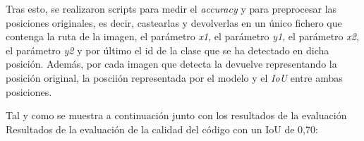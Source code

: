 Tras esto, se realizaron scripts para medir el \textit{accuracy} y para preprocesar las posiciones originales, es decir, castearlas y devolverlas en un único fichero que contenga la ruta de la imagen, el parámetro \textit{x1}, el parámetro \textit{y1}, el parámetro \textit{x2}, el parámetro \textit{y2} y por último el id de la clase que se ha detectado en dicha posición.
Además, por cada imagen que detecta la devuelve representando la posición original, la posciión representada por el modelo y el \textit{IoU} entre ambas posiciones.

\clearpage

Tal y como se muestra a continuación junto con los resultados de la evaluación
Resultados de la evaluación de la calidad del código con un IoU de 0,70:


